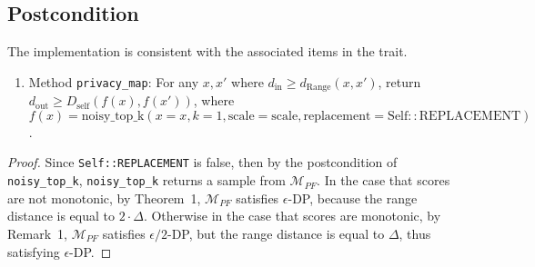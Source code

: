 \documentclass{article}
\begin{document}
\subsection*{Postcondition}
\begin{theorem}
    The implementation is consistent with the associated items in the  trait.
    \begin{enumerate}
        \item Method \texttt{privacy\_map}:
        For any $x, x'$ where $d_\mathrm{in} \ge d_\mathrm{Range}(x, x')$,
        return $d_\mathrm{out} \ge D_\mathrm{self}(f(x), f(x'))$,
        where $f(x) = \mathrm{noisy\_top\_k}(x=x, k=1, \mathrm{scale}=\mathrm{scale}, \mathrm{replacement}=\mathrm{Self::REPLACEMENT})$.
    \end{enumerate}
\end{theorem}

\begin{proof}
    Since \texttt{Self::REPLACEMENT} is false, then by the postcondition of \texttt{noisy\_top\_k},
    \texttt{noisy\_top\_k} returns a sample from $\mathcal{M}_{PF}$.
    In the case that scores are not monotonic,
    by \cite{mckenna2020permute} Theorem~1, $\mathcal{M}_{PF}$ satisfies $\epsilon$-DP,
    because the range distance is equal to $2 \cdot \Delta$.
    Otherwise in the case that scores are monotonic,
    by \cite{mckenna2020permute} Remark~1, $\mathcal{M}_{PF}$ satisfies $\epsilon/2$-DP,
    but the range distance is equal to $\Delta$, thus satisfying $\epsilon$-DP.
\end{proof}


\end{document}
